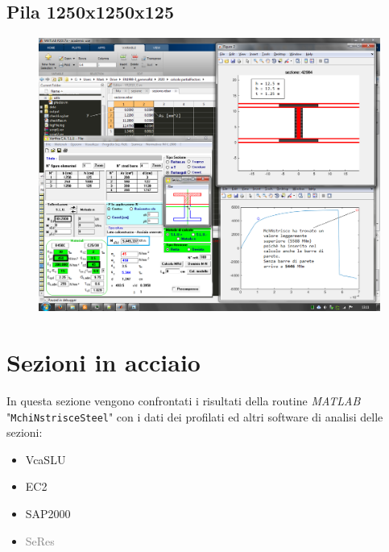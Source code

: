 \documentclass[10pt]{article}
\begin{document}
\subsection{Pila 1250x1250x125}

\begin{figure}[H]
\centering
\includegraphics[width=\textwidth]{img/WIP109.png}
\end{figure}








\newpage

\section{Sezioni in acciaio}

In questa sezione vengono confrontati i risultati della routine \textit{MATLAB} "\texttt{MchiNstrisceSteel}" con i dati dei profilati ed altri software di analisi delle sezioni:
\begin{itemize}[noitemsep]
\item VcaSLU
\item EC2
\item SAP2000
\item \textcolor{gray}{SeRes}
\end{itemize}








\newpage

\appendix
\end{document}
